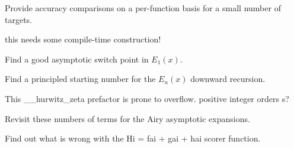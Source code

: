 
\begin{DoxyRefList}
\item[\label{todo__todo000001}%
\hypertarget{todo__todo000001}{}%
page \hyperlink{index}{Mathematical Special Functions} ]Provide accuracy comparisons on a per-\/function basis for a small number of targets. 
\item[\label{todo__todo000004}%
\hypertarget{todo__todo000004}{}%
Member \hyperlink{namespacestd_1_1____detail_a3ad3b7b4dcebdf69778dbf7a5ba2427c}{std\+:\+:\+\_\+\+\_\+detail\+:\+:\+\_\+\+\_\+dawson\+\_\+cont\+\_\+frac} (\+\_\+\+Tp \+\_\+\+\_\+x)]this needs some compile-\/time construction!  
\item[\label{todo__todo000006}%
\hypertarget{todo__todo000006}{}%
Member \hyperlink{namespacestd_1_1____detail_a665eb0c524b929c035d88bbb17815917}{std\+:\+:\+\_\+\+\_\+detail\+:\+:\+\_\+\+\_\+expint\+\_\+\+E1} (\+\_\+\+Tp \+\_\+\+\_\+x)]Find a good asymptotic switch point in $ E_1(x) $.  
\item[\label{todo__todo000005}%
\hypertarget{todo__todo000005}{}%
Member \hyperlink{namespacestd_1_1____detail_a9b0a2050324390fb6c4a584170289a99}{std\+:\+:\+\_\+\+\_\+detail\+:\+:\+\_\+\+\_\+expint\+\_\+\+En\+\_\+recursion} (unsigned int \+\_\+\+\_\+n, \+\_\+\+Tp \+\_\+\+\_\+x)]Find a principled starting number for the $ E_n(x) $ downward recursion.  
\item[\label{todo__todo000007}%
\hypertarget{todo__todo000007}{}%
Member \hyperlink{namespacestd_1_1____detail_a7eb061915bad44dd29443b3476eaa7a0}{std\+:\+:\+\_\+\+\_\+detail\+:\+:\+\_\+\+\_\+hurwitz\+\_\+zeta} (\+\_\+\+Tp \+\_\+\+\_\+s, std\+::complex$<$ \+\_\+\+Tp $>$ \+\_\+\+\_\+a)]This \+\_\+\+\_\+hurwitz\+\_\+zeta prefactor is prone to overflow. positive integer orders s?  
\item[\label{todo__todo000003}%
\hypertarget{todo__todo000003}{}%
Member \hyperlink{classstd_1_1____detail_1_1__Airy__asymp_a6ae932883f0b6cfe86c6e7beda807385}{std\+:\+:\+\_\+\+\_\+detail\+:\+:\+\_\+\+Airy\+\_\+asymp$<$ \+\_\+\+Tp $>$\+:\+:\+\_\+\+S\+\_\+absarg\+\_\+lt\+\_\+pio3} (std\+::complex$<$ \+\_\+\+Tp $>$ \+\_\+\+\_\+z) const ]Revisit these numbers of terms for the Airy asymptotic expansions.  
\item[\label{todo__todo000002}%
\hypertarget{todo__todo000002}{}%
Member \hyperlink{classstd_1_1____detail_1_1__Airy__series_a7d6250d9854644966a349669ddf2d929}{std\+:\+:\+\_\+\+\_\+detail\+:\+:\+\_\+\+Airy\+\_\+series$<$ \+\_\+\+Tp $>$\+:\+:\+\_\+\+S\+\_\+\+Scorer} (std\+::complex$<$ \+\_\+\+Tp $>$ \+\_\+\+\_\+t)]Find out what is wrong with the Hi = fai + gai + hai scorer function.
\end{DoxyRefList}